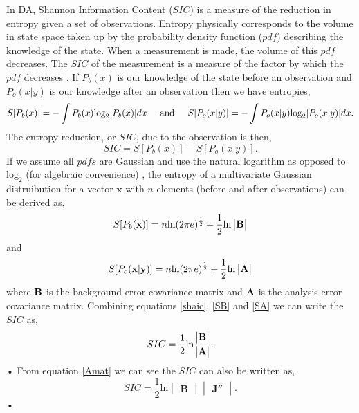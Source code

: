 \documentclass[11pt]{article}
\begin{document}
In DA, Shannon Information Content ($SIC$) is a measure of the reduction in entropy given a set of observations. Entropy physically corresponds to the volume in state space taken up by the probability density function ($pdf$) describing the knowledge of the state. When a measurement is made, the volume of this $pdf$ decreases. The $SIC$ of the measurement is a measure of the factor by which the $pdf$ decreases \cite{rodgers2000inverse}. If $P_b(x)$ is our knowledge of the state before an observation and $P_o(x|y)$ is our knowledge after an observation then we have entropies,
\[
S[P_b(x)] = - \int P_b(x)\text{log}_2[P_b(x)]dx
 \hspace{5mm} \text{and} \hspace{5mm} 
S[P_o(x|y)] = - \int P_o(x|y)\text{log}_2[P_o(x|y)]dx.
\]
The entropy reduction, or $SIC$, due to the observation is then,
\begin{equation} \label{shaic}
SIC =  S[P_b(x)]-S[P_o(x|y)].
\end{equation}
If we assume all $pdfs$ are Gaussian and use the natural logarithm as opposed to $\text{log}_2$ (for algebraic convenience) \cite{rodgers2000inverse}, the entropy of a multivariate Gaussian distruibution for a vector $\textbf{x}$ with $n$ elements (before and after observations) can be derived as,
\begin{equation} \label{SB}
 S[P_b(\textbf{x})] = n\text{ln}(2\pi e)^{\frac{1}{2}}+\frac{1}{2}\text{ln}\begin{vmatrix}\bf{B}\end{vmatrix}
\end{equation}
and
\begin{equation} \label{SA}
 S[P_o(\textbf{x}|\textbf{y})] = n\text{ln}(2\pi e)^{\frac{1}{2}}+\frac{1}{2}\text{ln}\begin{vmatrix}\bf{A}\end{vmatrix}
\end{equation}
where $\bf{B}$ is the background error covariance matrix and $\bf{A}$ is the analysis error covariance matrix. Combining equations \ref{shaic}, \ref{SB} and \ref{SA} we can write the $SIC$ as,
\begin{equation}
SIC=\frac{1}{2}\text{ln}\frac{\begin{vmatrix} \bf{B} \end{vmatrix}}{\begin{vmatrix} \bf{A} \end{vmatrix}}.
\end{equation}•
From equation \ref{Amat} we can see the $SIC$ can also be written as,
\begin{equation}
SIC= \frac{1}{2}\text{ln}\begin{vmatrix} \mathbf{B} \end{vmatrix}\begin{vmatrix} \mathbf{J}'' \end{vmatrix}. \label{sic}
\end{equation}•
\end{document}
